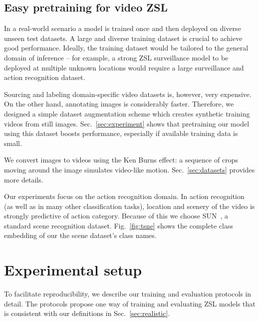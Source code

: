 \documentclass[10pt,twocolumn,letterpaper]{article}
\begin{document}
\subsection{Easy pretraining for video ZSL}\label{sec:sun}
In a real-world scenario a model is trained once and then deployed on diverse unseen test datasets. A large and diverse training dataset is crucial to achieve good performance. Ideally, the training dataset would be tailored to the general domain of inference -- for example, a strong ZSL surveillance model to be deployed at multiple unknown locations would require a large surveillance and action recognition dataset.

Sourcing and labeling domain-specific video datasets is, however, very expensive. On the other hand, annotating images is considerably faster. Therefore, we designed a simple dataset augmentation scheme which creates synthetic training videos from still images. Sec.~\ref{sec:experiment} shows that pretraining our model using this dataset boosts performance, especially if available training data is small. 

We convert images to videos using the Ken Burns effect: a sequence of crops moving around the image simulates video-like motion. Sec.~\ref{sec:datasets} provides more details.

Our experiments focus on the action recognition domain. In action recognition (as well as in many other classification tasks), location and scenery of the video is strongly predictive of action category. Because of this we choose SUN~\cite{sun}, a standard scene recognition dataset. Fig.~\ref{fig:tsne} shows the complete class embedding of our the scene dataset's class names.

\section{Experimental setup}\label{sec:implementation}
To facilitate reproducibility, we describe our training and evaluation protocols in detail. The protocols propose one way of training and evaluating ZSL models that is consistent with our definitions in Sec.~\ref{sec:realistic}. 
\end{document}
